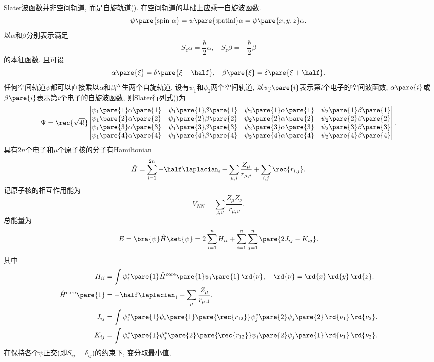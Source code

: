\documentclass[hidelinks]{ctexart}
\begin{document}
Slater波函数并非空间轨道, 而是自旋轨道(). 在空间轨道的基础上应乘一自旋波函数.
\[ \psi\pare{\mathrm{spin\ }\alpha} = \psi\pare{\mathrm{spatial}}\alpha = \psi\pare{x,y,z}\alpha. \]
以$\alpha$和$\beta$分别表示满足
\[ S_z \alpha = \frac{\hbar}{2}\alpha,\quad S_z \beta = -\frac{\hbar}{2}\beta \]
的本征函数. 且可设
\[ \alpha\pare{\xi} = \delta\pare{\xi - \half},\quad \beta\pare{\xi} = \delta\pare{\xi + \half}. \]
任何空间轨道$\psi$都可以直接乘以$\alpha$和$\beta$产生两个自旋轨道. 设有$\psi_1$和$\psi_2$两个空间轨道, 以$\psi_j\pare{i}$表示第$i$个电子的空间波函数, $\alpha\pare{i}$或$\beta\pare{i}$表示第$i$个电子的自旋波函数, 则Slater行列式()为
\[ \Psi = \rec{\sqrt{4!}} \begin{vmatrix}
    \psi_1\pare{1}\alpha\pare{1} & \psi_1\pare{1}\beta\pare{1} & \psi_2\pare{1}\alpha\pare{1} & \psi_2\pare{1}\beta\pare{1} \\
    \psi_1\pare{2}\alpha\pare{2} & \psi_1\pare{2}\beta\pare{2} & \psi_2\pare{2}\alpha\pare{2} & \psi_2\pare{2}\beta\pare{2} \\
    \psi_1\pare{3}\alpha\pare{3} & \psi_1\pare{3}\beta\pare{3} & \psi_2\pare{3}\alpha\pare{3} & \psi_2\pare{3}\beta\pare{3} \\
    \psi_1\pare{4}\alpha\pare{4} & \psi_1\pare{4}\beta\pare{4} & \psi_2\pare{4}\alpha\pare{4} & \psi_2\pare{4}\beta\pare{4}
\end{vmatrix}. \]
具有$2n$个电子和$\mu$个原子核的分子有Hamiltonian
\[ \hat H = \sum_{i=1}^{2n} -\half \laplacian_i - \sum_{\mu,i} \frac{Z_\mu}{r_{\mu,i}} + \sum_{i,j}\rec{r_{i,j}}. \]
记原子核的相互作用能为
\[ V_{NN} = \sum_{\mu,\nu} \frac{Z_\mu Z_\nu}{r_{\mu,\nu}}. \]
总能量为
\[ E = \bra{\psi}\hat H\ket{\psi} = 2\sum_{i=1}^n H_{ii} + \sum_{i=1}^n \sum_{j=1}^n \pare{2J_{ij} - K_{ij}}. \]
其中
\begin{align*}
    H_{ii} &= \int \psi_i^*\pare{1} \hat H^{\mathrm{core}}\pare{1} \psi_i\pare{1}\,\rd{\nu},\quad \rd{\nu} = \rd{x}\,\rd{y}\,\rd{z}. \\
    \hat H^{\mathrm{core}}\pare{1} &= -\half \laplacian_1 - \sum_{\mu} \frac{Z_\mu}{r_{\mu,1}}. \\
    J_{ij} &= \int \psi^*_i\pare{1}\psi_i\pare{1} \pare{\rec{r_{12}}}\psi_j^*\pare{2} \psi_j\pare{2}\,\rd{\nu_1}\,\rd{\nu_2}. \\
    K_{ij} &= \int \psi^*_i\pare{1}\psi_j^*\pare{2}\pare{\rec{r_{12}}}\psi_i\pare{2}\psi_j\pare{1}\,\rd{\nu_1}\,\rd{\nu_2}.
\end{align*}
在保持各个$\psi$正交(即$S_{ij} = \delta_{ij}$)的约束下, 变分取最小值,
\end{document}
